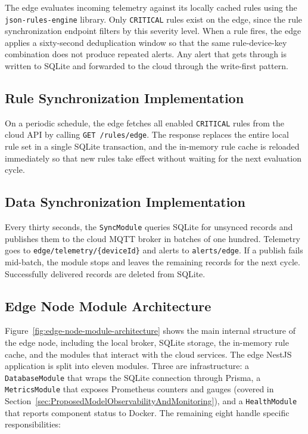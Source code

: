 The edge evaluates incoming telemetry against its locally cached rules using the \texttt{json-rules-engine} library. Only \texttt{CRITICAL} rules exist on the edge, since the rule synchronization endpoint filters by this severity level. When a rule fires, the edge applies a sixty-second deduplication window so that the same rule-device-key combination does not produce repeated alerts. Any alert that gets through is written to SQLite and forwarded to the cloud through the write-first pattern.

\subsection{Rule Synchronization Implementation}
\label{subsec:RuleSyncImpl}

On a periodic schedule, the edge fetches all enabled \texttt{CRITICAL} rules from the cloud \gls{API} by calling \texttt{GET /rules/edge}. The response replaces the entire local rule set in a single SQLite transaction, and the in-memory rule cache is reloaded immediately so that new rules take effect without waiting for the next evaluation cycle.

\subsection{Data Synchronization Implementation}
\label{subsec:DataSyncImpl}

Every thirty seconds, the \texttt{SyncModule} queries SQLite for unsynced records and publishes them to the cloud \gls{MQTT} broker in batches of one hundred. Telemetry goes to \texttt{edge/telemetry/\{deviceId\}} and alerts to \texttt{alerts/edge}. If a publish fails mid-batch, the module stops and leaves the remaining records for the next cycle. Successfully delivered records are deleted from SQLite.

\subsection{Edge Node Module Architecture}
\label{subsec:EdgeModuleArchitecture}

Figure~\ref{fig:edge-node-module-architecture} shows the main internal structure of the edge node, including the local broker, SQLite storage, the in-memory rule cache, and the modules that interact with the cloud services. The edge NestJS application is split into eleven modules. Three are infrastructure: a \texttt{DatabaseModule} that wraps the SQLite connection through Prisma, a \texttt{MetricsModule} that exposes Prometheus counters and gauges (covered in Section~\ref{sec:ProposedModelObservabilityAndMonitoring}), and a \texttt{HealthModule} that reports component status to Docker. The remaining eight handle specific responsibilities:

